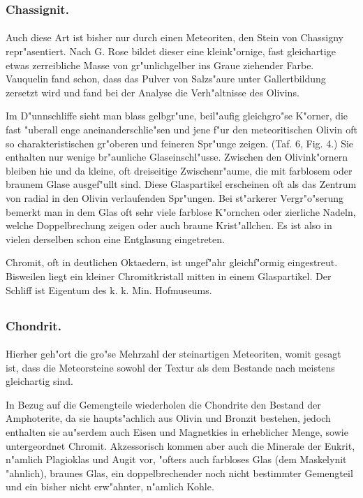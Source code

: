 \documentclass[a4paper, 11pt, oneside, polutonikogreek, german]{article}
\begin{document}
\subsubsection{Chassignit.}
\paragraph{}
Auch diese Art ist bisher nur durch einen Meteoriten, den Stein von Chassigny repr"asentiert. Nach G. Rose bildet dieser eine kleink"ornige, fast gleichartige etwas zerreibliche Masse von gr"unlichgelber ins Graue ziehender Farbe. Vauquelin fand schon, dass das Pulver von Salzs"aure unter Gallertbildung zersetzt wird und fand bei der Analyse die Verh"altnisse des Olivins.

Im D"unnschliffe sieht man blass gelbgr"une, beil"aufig gleichgro"se K"orner, die fast "uberall enge aneinanderschlie"sen und jene f"ur den meteoritischen Olivin oft so charakteristischen gr"oberen und feineren Spr"unge zeigen. (Taf. 6, Fig. 4.) Sie enthalten nur wenige br"aunliche Glaseinschl"usse. Zwischen den Olivink"ornern bleiben hie und da kleine, oft dreiseitige Zwischenr"aume, die mit farblosem oder braunem Glase ausgef"ullt sind. Diese Glaspartikel erscheinen oft als das Zentrum von radial in den Olivin verlaufenden Spr"ungen. Bei st"arkerer Vergr"o"serung bemerkt man in dem Glas oft sehr viele farblose K"ornchen oder zierliche Nadeln, welche Doppelbrechung zeigen oder auch braune Krist"allchen. Es ist also in vielen derselben schon eine Entglasung eingetreten.

Chromit, oft in deutlichen Oktaedern, ist ungef"ahr gleichf"ormig eingestreut. Bisweilen liegt ein kleiner Chromitkristall mitten in einem Glaspartikel. Der Schliff ist Eigentum des k. k. Min. Hofmuseums.
\clearpage
\subsection{}
\subsubsection{Chondrit.}
\paragraph{}
Hierher geh"ort die gro"se Mehrzahl der steinartigen Meteoriten, womit gesagt ist, dass die Meteorsteine sowohl der Textur als dem Bestande nach meistens gleichartig sind.

In Bezug auf die Gemengteile wiederholen die Chondrite den Bestand der Amphoterite, da sie haupts"achlich aus Olivin und Bronzit bestehen, jedoch enthalten sie au"serdem auch Eisen und Magnetkies in erheblicher Menge, sowie untergeordnet Chromit. Akzessorisch kommen aber auch die Minerale der Eukrit, n"amlich Plagioklas und Augit vor, "ofters auch farbloses Glas (dem Maskelynit "ahnlich), braunes Glas, ein doppelbrechender noch nicht bestimmter Gemengteil und ein bisher nicht erw"ahnter, n"amlich Kohle.
\end{document}
